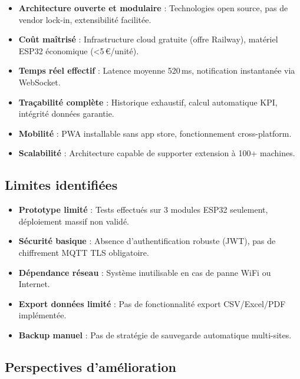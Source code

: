 \begin{itemize}
    \item \textbf{Architecture ouverte et modulaire} : Technologies open source, pas de vendor lock-in, extensibilité facilitée.
    \item \textbf{Coût maîtrisé} : Infrastructure cloud gratuite (offre Railway), matériel ESP32 économique (<5\,€/unité).
    \item \textbf{Temps réel effectif} : Latence moyenne 520\,ms, notification instantanée via WebSocket.
    \item \textbf{Traçabilité complète} : Historique exhaustif, calcul automatique KPI, intégrité données garantie.
    \item \textbf{Mobilité} : PWA installable sans app store, fonctionnement cross-platform.
    \item \textbf{Scalabilité} : Architecture capable de supporter extension à 100+ machines.
\end{itemize}

\subsection{Limites identifiées}

\begin{itemize}
    \item \textbf{Prototype limité} : Tests effectués sur 3 modules ESP32 seulement, déploiement massif non validé.
    \item \textbf{Sécurité basique} : Absence d'authentification robuste (JWT), pas de chiffrement MQTT TLS obligatoire.
    \item \textbf{Dépendance réseau} : Système inutilisable en cas de panne WiFi ou Internet.
    \item \textbf{Export données limité} : Pas de fonctionnalité export CSV/Excel/PDF implémentée.
    \item \textbf{Backup manuel} : Pas de stratégie de sauvegarde automatique multi-sites.
\end{itemize}

\subsection{Perspectives d'amélioration}

